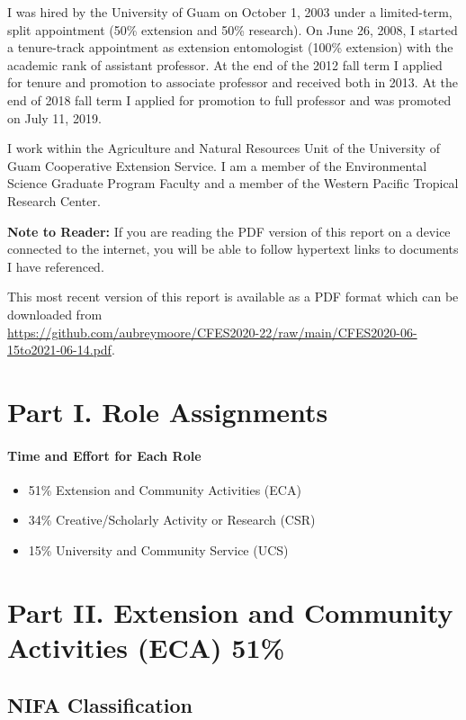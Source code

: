 I was hired by the University of Guam on October 1, 2003 under a limited-term,
split appointment (50\% extension and 50\% research). On June 26,
2008, I started a tenure-track appointment as extension entomologist
(100\% extension) with the academic rank of assistant professor. At
the end of the 2012 fall term I applied for tenure and promotion to associate professor and
received both in 2013. At the end of 2018 fall term I applied for promotion to
full professor and was promoted on July 11, 2019. 

I work within the Agriculture and Natural Resources Unit of the University
of Guam Cooperative Extension Service. I am a member of the
Environmental Science Graduate Program Faculty and a member of the Western
Pacific Tropical Research Center. 

\vspace{0.5in}
\textbf{Note to Reader:}
If you are reading the PDF version of this report on a device connected
to the internet, you will be able to follow hypertext links to documents
I have referenced.

This most recent version of this report is available as a PDF format which can be downloaded from\\
{\small \url{https://github.com/aubreymoore/CFES2020-22/raw/main/CFES2020-06-15to2021-06-14.pdf}.} 


\pagebreak

\section{Part I. Role Assignments}
\paragraph{Time and Effort for Each Role}
\begin{itemize}
	\item 51\% Extension and Community Activities (ECA)
	\item 34\% Creative/Scholarly Activity or Research (CSR)
	\item 15\% University and Community Service (UCS)
\end{itemize}

\section{Part II. Extension and Community Activities (ECA) 51\%}

\subsection{NIFA Classification}

